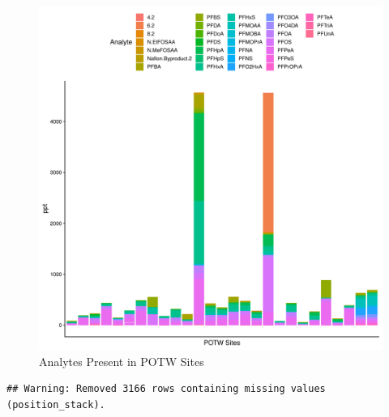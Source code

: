 \documentclass[
  12pt,
]{article}
\begin{document}
\begin{figure}

\includegraphics{PFAS_FinalProject_files/figure-latex/unnamed-chunk-13-1} \hfill{}

\caption{Analytes Present in POTW Sites}\label{fig:unnamed-chunk-13}
\end{figure}

\begin{verbatim}
## Warning: Removed 3166 rows containing missing values (position_stack).
\end{verbatim}
\end{document}
